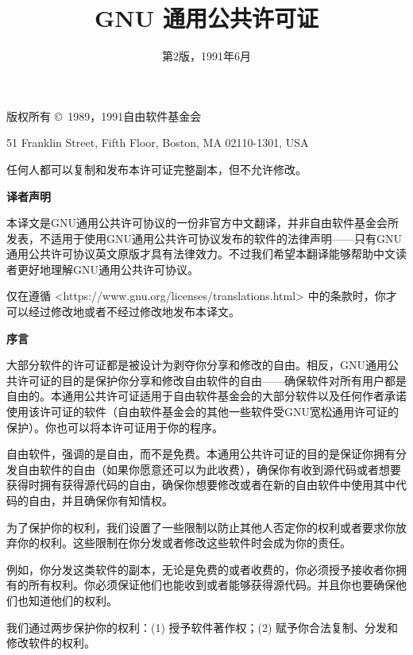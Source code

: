 \documentclass[11pt]{article}
\title{GNU 通用公共许可证}
\date{第2版，1991年6月}
\begin{document}
\maketitle

\begin{center}
{\parindent 0in

版权所有 \copyright\ 1989，1991自由软件基金会

\bigskip

51 Franklin Street, Fifth Floor, Boston, MA  02110-1301, USA

\bigskip

任何人都可以复制和发布本许可证完整副本，但不允许修改。
}
\end{center}

\begin{center}
  {\bf\large 译者声明}
\end{center}

本译文是GNU通用公共许可协议的一份非官方中文翻译，并非自由软件基金会所发表，不适用于使用GNU通用公共许可协议发布的软件的法律声明——只有GNU通用公共许可协议英文原版才具有法律效力。不过我们希望本翻译能够帮助中文读者更好地理解GNU通用公共许可协议。

仅在遵循 <https://www.gnu.org/licenses/translations.html> 中的条款时，你才可以经过修改地或者不经过修改地发布本译文。

\begin{center}
{\bf\large 序言}
\end{center}

大部分软件的许可证都是被设计为剥夺你分享和修改的自由。相反，GNU通用公共许可证的目的是保护你分享和修改自由软件的自由——确保软件对所有用户都是自由的。本通用公共许可证适用于自由软件基金会的大部分软件以及任何作者承诺使用该许可证的软件（自由软件基金会的其他一些软件受GNU宽松通用许可证的保护）。你也可以将本许可证用于你的程序。

自由软件，强调的是自由，而不是免费。本通用公共许可证的目的是保证你拥有分发自由软件的自由（如果你愿意还可以为此收费），确保你有收到源代码或者想要获得时拥有获得源代码的自由，确保你想要修改或者在新的自由软件中使用其中代码的自由，并且确保你有知情权。

为了保护你的权利，我们设置了一些限制以防止其他人否定你的权利或者要求你放弃你的权利。这些限制在你分发或者修改这些软件时会成为你的责任。

例如，你分发这类软件的副本，无论是免费的或者收费的，你必须授予接收者你拥有的所有权利。你必须保证他们也能收到或者能够获得源代码。并且你也要确保他们也知道他们的权利。

我们通过两步保护你的权利：(1) 授予软件著作权；(2) 赋予你合法复制、分发和修改软件的权利。
\end{document}
